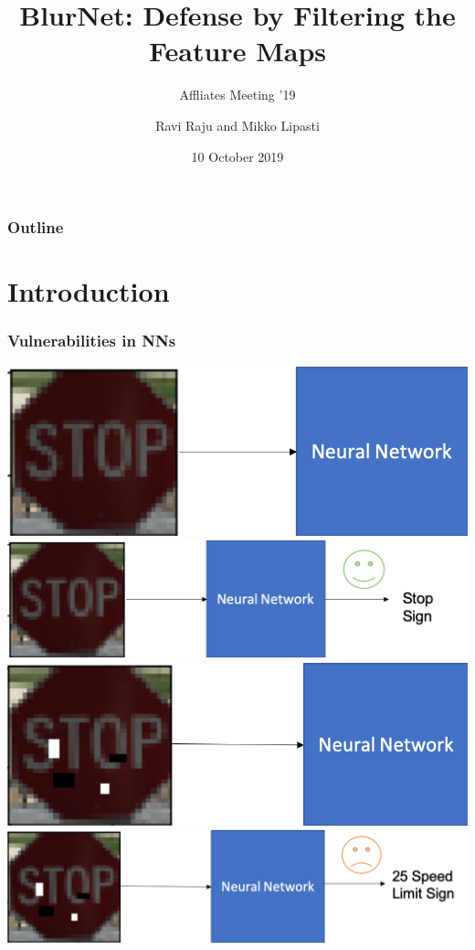 \documentclass{beamer}
\title{BlurNet: Defense by Filtering the Feature Maps}
\subtitle{Affliates Meeting '19}
\author{Ravi Raju and Mikko Lipasti}
\date{10 October 2019}
\institute{UW Madison ECE Dept.}
\begin{document}
\begin{frame}
	\titlepage
\end{frame}

\begin{frame}
\frametitle{Outline}
\tableofcontents
\end{frame}

\section{Introduction} %
\begin{frame}
\frametitle{Vulnerabilities in NNs}
\centering
{} {\includegraphics[scale=0.4]{clean_class1.png}\hspace{2.2cm}}
 {\includegraphics[scale=0.4]{cleanclassification2.png}}
 {\includegraphics[scale=0.4]{advclassification1.png}\hspace{2.2cm}}
 {\includegraphics[scale=0.4]{advclassification2.png}}
\end{frame}
\end{document}
